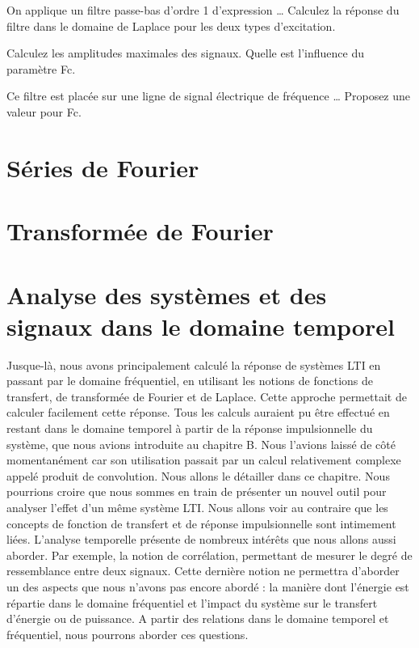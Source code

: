 \documentclass[]{book}
\begin{document}
{	On applique un filtre passe-bas d'ordre 1 d'expression … Calculez la réponse du filtre dans le domaine de Laplace pour les deux types d'excitation.
	
	Calculez les amplitudes maximales des signaux. Quelle est l'influence du paramètre Fc.
	
	Ce filtre est placée sur une ligne de signal électrique de fréquence … Proposez une valeur pour Fc.
	
	\newpage
	
\chapter{Séries de Fourier}


	\newpage
	
\chapter{Transformée de Fourier}

	\newpage
	
\chapter{Analyse des systèmes et des signaux dans le domaine temporel}
	
	Jusque-là, nous avons principalement calculé la réponse de systèmes LTI en passant par le domaine fréquentiel, en utilisant les notions de fonctions de transfert, de transformée de Fourier et de Laplace. Cette approche permettait de calculer facilement cette réponse.
	Tous les calculs auraient pu être effectué en restant dans le domaine temporel à partir de la réponse impulsionnelle du système, que nous avions introduite au chapitre B. Nous l'avions laissé de côté momentanément car son utilisation passait par un calcul relativement complexe appelé produit de convolution. Nous allons le détailler dans ce chapitre.
	Nous pourrions croire que nous sommes en train de présenter un nouvel outil pour analyser l'effet d'un même système LTI. Nous allons voir au contraire que les concepts de fonction de transfert et de réponse impulsionnelle sont intimement liées.
	L'analyse temporelle présente de nombreux intérêts que nous allons aussi aborder. Par exemple, la notion de corrélation, permettant de mesurer le degré de ressemblance entre deux signaux. Cette dernière notion ne permettra d'aborder un des aspects que nous n'avons pas encore abordé : la manière dont l'énergie est répartie dans le domaine fréquentiel et l'impact du système sur le transfert d'énergie ou de puissance. A partir des relations dans le domaine temporel et fréquentiel, nous pourrons aborder ces questions.
	
}
\end{document}
